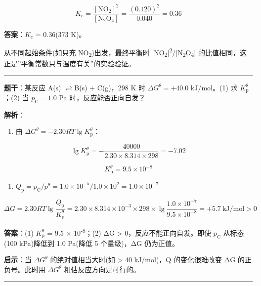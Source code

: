 \documentclass[a4paper,11pt]{ctexart}
\providecommand{\tightlist}{\setlength{\itemsep}{0pt}\setlength{\parskip}{0pt}}
\newcommand{\箭}{\ensuremath{\rightarrow}}
\newcommand{\左箭}{\ensuremath{\leftarrow}}
\newcommand{\上箭}{\ensuremath{\uparrow}}
\newcommand{\下箭}{\ensuremath{\downarrow}}
\newcommand{\衡}{\ensuremath{\rightleftharpoons}}
\newcommand{\双箭}{\ensuremath{\leftrightarrow}}
\newcommand{\约等于}{\ensuremath{\approx}}
\newcommand{\小于等于}{\ensuremath{\leq}}
\newcommand{\大于等于}{\ensuremath{\geq}}
\newcommand{\不等于}{\ensuremath{\neq}}
\newcommand{\西格马}{\ensuremath{\sigma}}
\newcommand{\派}{\ensuremath{\pi}}
\begin{document}
\[K_{\mathrm c} = \frac{[\mathrm{NO_2}]^2}{[\mathrm{N_2O_4}]} = \frac{(0.120)^2}{0.040} = 0.36\]

\textbf{答案}：\(K_{\mathrm c}\) = 0.36(373 K)。

从不同起始条件(如只充 NO\textsubscript{2})出发，最终平衡时 {[}NO\textsubscript{2}{]}\textsuperscript{2}/{[}N\textsubscript{2}O\textsubscript{4}{]} 的比值相同，这正是''平衡常数只与温度有关''的实验验证。

\begin{center}\rule{0.5\linewidth}{0.5pt}\end{center}

\textbf{题干}：某反应 A(s) \衡 B(s) + C(g)，298 K 时 \(\Delta G^\theta = +40.0\) kJ/mol。(1) 求 \(K_{\mathrm p}^\theta\)；(2) 当 \(p_{\mathrm C} = 1.0\) Pa 时，反应能否正向自发？

\textbf{解析}：

\begin{enumerate}
\def\labelenumi{(\arabic{enumi})}
\tightlist
\item
  由 \(\Delta G^\theta = -2.30RT \lg K_{\mathrm p}^\theta\)：
\end{enumerate}

\[\lg K_{\mathrm p}^\theta = -\frac{40000}{2.30 \times 8.314 \times 298} = -7.02\]

\[K_{\mathrm p}^\theta = 9.5 \times 10^{-8}\]

\begin{enumerate}
\def\labelenumi{(\arabic{enumi})}
\setcounter{enumi}{1}
\tightlist
\item
  \(Q_{\mathrm p} = p_{\mathrm C}/p^\theta = 1.0 \times 10^{-5} / 1.0 \times 10^2 = 1.0 \times 10^{-7}\)
\end{enumerate}

\[\Delta G = 2.30RT\lg\frac{Q_{\mathrm p}}{K_{\mathrm p}^\theta} = 2.30 \times 8.314 \times 10^{-3} \times 298 \times \lg\frac{1.0 \times 10^{-7}}{9.5 \times 10^{-8}} = +5.7\ \mathrm{kJ/mol} > 0\]

\textbf{答案}：(1) \(K_{\mathrm p}^\theta\) = 9.5 × 10\textsuperscript{-8}；(2) ΔG \textgreater{} 0，反应不能正向自发。即使 \(p_{\mathrm C}\) 从标态(100 kPa)降低到 1.0 Pa(降低 5 个量级)，ΔG 仍为正值。

\textbf{启示}：当 \(\Delta G^\theta\) 的绝对值相当大时(如 \textgreater{} 40 kJ/mol)，Q 的变化很难改变 ΔG 的正负号。此时用 \(\Delta G^\theta\) 粗估反应方向是可行的。

\begin{center}\rule{0.5\linewidth}{0.5pt}\end{center}
\end{document}
